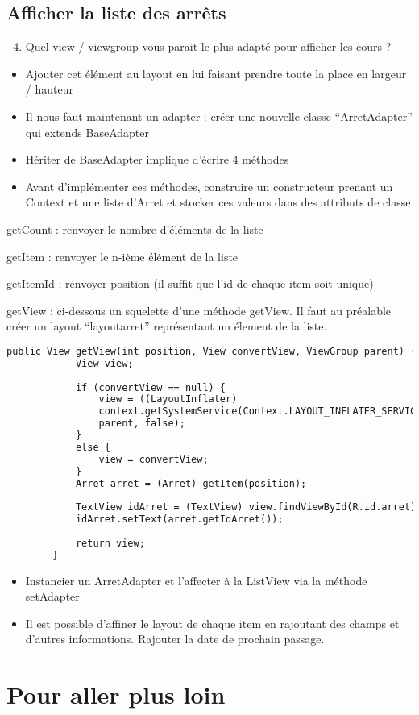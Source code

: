 \documentclass{article}
\begin{document}
\subsection{Afficher la liste des arrêts}
\begin{enumerate}
 \setcounter{enumi}{3}
\item Quel view / viewgroup vous parait le plus adapté pour afficher les cours ?
\end{enumerate}
\begin{itemize} 
  \item Ajouter cet élément au layout en lui faisant prendre toute la place en
  largeur / hauteur
  \item Il nous faut maintenant un adapter : créer une nouvelle classe
  ``ArretAdapter'' qui extends BaseAdapter
  \item Hériter de BaseAdapter implique d'écrire 4 méthodes
  \item Avant d'implémenter ces méthodes, construire un constructeur prenant un
  Context et une liste d'Arret et stocker ces valeurs dans des attributs de
  classe
 \end{itemize}
 \begin{description}
   \item getCount : renvoyer le nombre d'éléments de la liste
   \item getItem : renvoyer le n-ième élément de la liste
   \item getItemId : renvoyer position (il suffit que l'id de chaque item soit
   unique)
   \item getView : ci-dessous un squelette d'une méthode getView. Il faut au
   préalable créer un layout ``layoutarret'' représentant un élement de la
   liste.
 \end{description}
  \begin{lstlisting}[language=XML]
   public View getView(int position, View convertView, ViewGroup parent) {
			View view;
			
			if (convertView == null) {
				view = ((LayoutInflater)
				context.getSystemService(Context.LAYOUT_INFLATER_SERVICE)).inflate(R.layout.layoutarret,
				parent, false); 
			} 
			else { 
				view = convertView;
			}
			Arret arret = (Arret) getItem(position);
	
			TextView idArret = (TextView) view.findViewById(R.id.arret);
			idArret.setText(arret.getIdArret());
			
			return view;
		}
\end{lstlisting} 

 \begin{itemize} 
  \item Instancier un ArretAdapter et l'affecter à la ListView via la méthode
  setAdapter
  \item Il est possible d'affiner le layout de chaque item en rajoutant des
  champs et d'autres informations. Rajouter la date de prochain passage.
\end{itemize}
\section{Pour aller plus loin}
\end{document}
